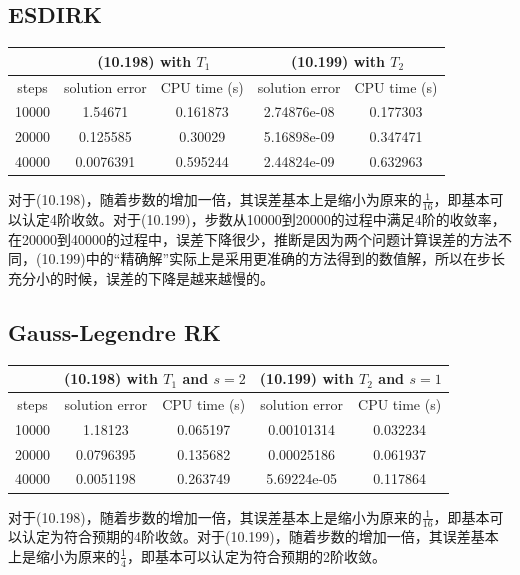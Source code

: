 \documentclass[a4paper,11.5pt,UTF8]{ctexart}
\begin{document}
\begin{large}
\subsection{ESDIRK}
\begin{center}
\begin{tabular}{|c|c|c|c|c|}
    \hline
     & \multicolumn{2}{c|}{(10.198) with $T_1$} & \multicolumn{2}{c|}{(10.199) with $T_2$} \\
     \hline
     steps & solution error & CPU time (s) & solution error & CPU time (s) \\
     \hline
     10000 & 1.54671 & 0.161873 & 2.74876e-08 & 0.177303 \\
     \hline
     20000 & 0.125585 & 0.30029 & 5.16898e-09 & 0.347471 \\
     \hline
     40000 & 0.0076391 & 0.595244 & 2.44824e-09 & 0.632963 \\
     \hline
\end{tabular}
\end{center}
\par 对于(10.198)，随着步数的增加一倍，其误差基本上是缩小为原来的$\frac{1}{16}$，即基本可以认定4阶收敛。对于(10.199)，步数从10000到20000的过程中满足4阶的收敛率，在20000到40000的过程中，误差下降很少，推断是因为两个问题计算误差的方法不同，(10.199)中的“精确解”实际上是采用更准确的方法得到的数值解，所以在步长充分小的时候，误差的下降是越来越慢的。

\subsection{Gauss-Legendre RK}
\begin{center}
\begin{tabular}{|c|c|c|c|c|}
    \hline
     & \multicolumn{2}{c|}{(10.198) with $T_1$ and $s=2$} & \multicolumn{2}{c|}{(10.199) with $T_2$ and $s=1$} \\
     \hline
     steps & solution error & CPU time (s) & solution error & CPU time (s) \\
     \hline
     10000 & 1.18123 & 0.065197 & 0.00101314 & 0.032234 \\
     \hline
     20000 & 0.0796395 & 0.135682 & 0.00025186 & 0.061937 \\
     \hline
     40000 & 0.0051198 & 0.263749 & 5.69224e-05 & 0.117864 \\
     \hline
\end{tabular}
\end{center}
\par 对于(10.198)，随着步数的增加一倍，其误差基本上是缩小为原来的$\frac{1}{16}$，即基本可以认定为符合预期的4阶收敛。对于(10.199)，随着步数的增加一倍，其误差基本上是缩小为原来的$\frac{1}{4}$，即基本可以认定为符合预期的2阶收敛。


\end{large}
\end{document}
